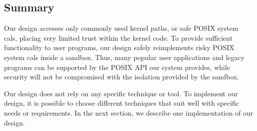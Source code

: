 \subsection{Summary}
Our design accesses only commonly used kernel paths, or safe POSIX
system cals, placing very limited trust within the kernel code. 
To provide sufficient functionality to user programs, our design 
safely reimplements risky POSIX system cals inside a sandbox. Thus, many 
popular user applications and legacy programs can be supported by 
the POSIX API our system provides, while security will not be compromised
with the isolation provided by the sandbox. 

Our design does not rely on any specific technique or tool. To implement our design, it is possible to choose different techniques 
that suit well with specific needs or requirements. In the next section, we describe one implementation of our design. 
